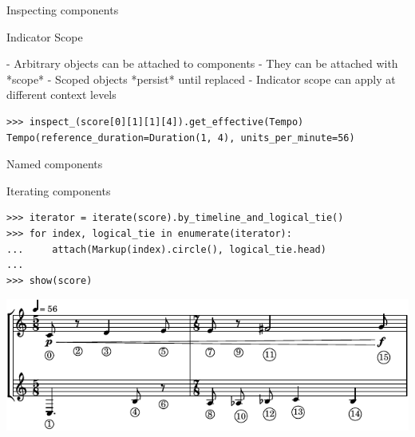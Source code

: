 \begin{frame}[fragile]{Inspecting components}
\end{frame}

\begin{frame}[fragile]{Indicator Scope}
\begin{markdown}
- Arbitrary objects can be attached to components
- They can be attached with *scope*
- Scoped objects *persist* until replaced
- Indicator scope can apply at different context levels
\end{markdown}

\begin{abjadbookoutput}
\begin{singlespacing}
\vspace{-0.5\baselineskip}
\begin{verbatim}
>>> inspect_(score[0][1][1][4]).get_effective(Tempo)
Tempo(reference_duration=Duration(1, 4), units_per_minute=56)
\end{verbatim}
\end{singlespacing}
\end{abjadbookoutput}

\end{frame}

\begin{frame}[fragile]{Named components}
\end{frame}

\begin{frame}[fragile]{Iterating components}

\begin{abjadbookoutput}
\begin{singlespacing}
\vspace{-0.5\baselineskip}
\begin{verbatim}
>>> iterator = iterate(score).by_timeline_and_logical_tie()
>>> for index, logical_tie in enumerate(iterator):
...     attach(Markup(index).circle(), logical_tie.head)
...
>>> show(score)
\end{verbatim}
\noindent\includegraphics[max width=\textwidth,]{assets/lilypond-bac258cb0abf4373a16fc304b9b6d35b.pdf}
\end{singlespacing}
\end{abjadbookoutput}

\end{frame}

